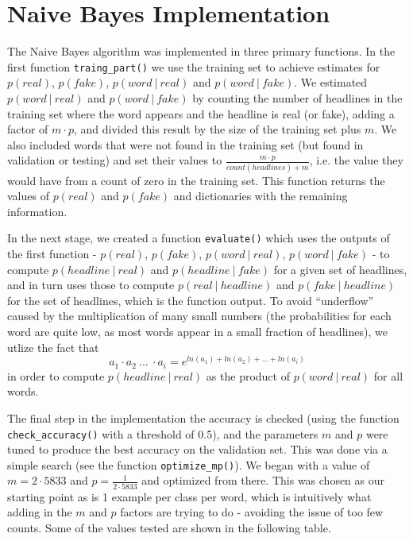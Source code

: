 \documentclass{article}
\begin{document}
   \section{Naive Bayes Implementation}
   The Naive Bayes algorithm was implemented in three primary functions.
   In the first function \texttt{traing\_part()} we use the training set to achieve estimates for $p(real)$,
   $p(fake)$, $p(word\ |\ real)$ and $p(word\ |\ fake)$. We estimated $ p(word\ |\ real)$ and $p(word\ |\ fake)$ by counting
   the number of headlines in the training set where the word appears and the headline is real (or fake), adding a
   factor of $ m \cdot p$, and divided this result by the size of the training set plus $m$. We also included
   words that were not found in the training set (but found in validation or testing) and set their
   values to $ \frac {m \cdot p}{count(headlines) + m}$, i.e. the value they would have from a count of zero in
   the training set. This function returns the values of $p(real)$ and $p(fake)$
   and dictionaries with the remaining information.

   In the next stage, we created a function \texttt{evaluate()} which uses the outputs of the first
   function -  $p(real)$, $p(fake)$, $p(word\ |\ real)$, $p(word\ |\ fake)$ - to
   compute $p(headline\ |\ real)$ and $p(headline\ |\ fake)$ for a given set of headlines, and in turn uses
   those to compute $p(real\ |\ headline)$ and $p(fake\ |\ headline)$ for the set of headlines, which is
   the function output. To avoid ``underflow'' caused by the multiplication of many small numbers (the
   probabilities for each word are quite low, as most words appear in a small fraction of headlines),
   we utlize the fact that
      \begin{equation*}
         a_1 \cdot a_2\ ...\ \cdot a_i =  e^{ln(a_1) + ln(a_2) + ... + ln(a_i)}
      \end{equation*}
   in order to compute $p(headline\ |\ real)$ as the product of $p(word\ |\ real)$ for all words.

   The final step in the implementation the accuracy is checked (using the function \texttt{check\_accuracy()}
   with a threshold of 0.5), and the parameters $m$ and $p$ were tuned to produce the best accuracy on
   the validation set. This was done via a simple search (see the function \texttt{optimize\_mp()}).
   We began with a value of $m = 2 \cdot 5833 $ and $p = \frac {1}{2 \cdot 5833}$ and optimized from there.
   This was chosen as our starting point as is 1 example per class per word, which is intuitively what adding in
   the $m$ and $p$ factors are trying to do - avoiding the issue of too few counts.
   Some of the values tested are shown in the following table.
\end{document}
